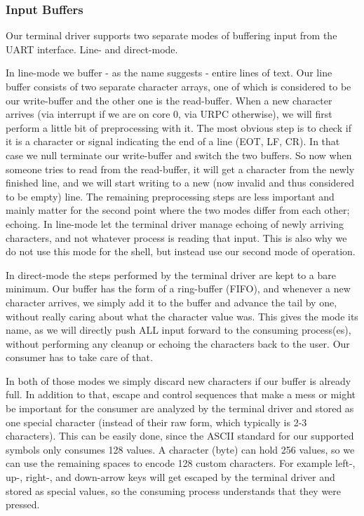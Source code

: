 \subsubsection{Input Buffers}\label{sss:input-buffers}

Our terminal driver supports two separate modes of buffering input from the 
UART interface. Line- and direct-mode.
\medskip

In line-mode we buffer - as the name suggests - entire lines of text. Our line 
buffer consists of two separate character arrays, one of which is considered to 
be our write-buffer and the other one is the read-buffer. When a new character 
arrives (via interrupt if we are on core 0, via URPC otherwise), we will first 
perform a little bit of preprocessing with it. The most obvious step is to 
check if it is a character or signal indicating the end of a line (EOT, LF, 
CR). In that case we null terminate our write-buffer and switch the two 
buffers. So now when someone tries to read from the read-buffer, it will get a 
character from the newly finished line, and we will start writing to a new (now 
invalid and thus considered to be empty) line. The remaining preprocessing 
steps are less important and mainly matter for the second point where the two 
modes differ from each other; echoing. In line-mode let the terminal driver 
manage echoing of newly arriving characters, and not whatever process is 
reading that input. This is also why we do not use this mode for the shell, but 
instead use our second mode of operation.
\medskip

In direct-mode the steps performed by the terminal driver are kept to a bare 
minimum. Our buffer has the form of a ring-buffer (FIFO), and whenever a new 
character arrives, we simply add it to the buffer and advance the tail by one, 
without really caring about what the character value was. This gives the mode 
its name, as we will directly push ALL input forward to the consuming 
process(es), without performing any cleanup or echoing the characters back to 
the user. Our consumer has to take care of that.
\medskip

In both of those modes we simply discard new characters if our buffer is 
already full. In addition to that, escape and control sequences that make a 
mess or might be important for the consumer are analyzed by the terminal driver 
and stored as one special character (instead of their raw form, which typically 
is 2-3 characters). This can be easily done, since the ASCII standard for our 
supported symbols only consumes 128 values. A character (byte) can hold 256 
values, so we can use the remaining spaces to encode 128 custom characters. For 
example left-, up-, right-, and down-arrow keys will get escaped by the 
terminal driver and stored as special values, so the consuming process 
understands that they were pressed.
\medskip

